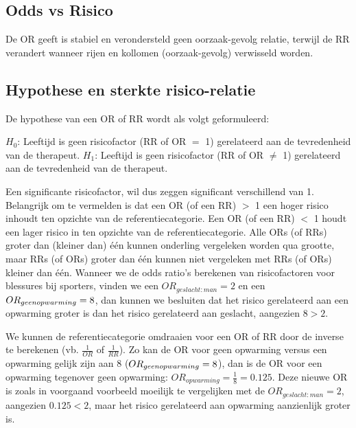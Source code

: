 \documentclass[
]{book}
\theoremstyle{definition}
\theoremstyle{definition}
\theoremstyle{definition}
\theoremstyle{definition}
\theoremstyle{remark}
\begin{document}
\hypertarget{odds-vs-risico}{%
\subsection*{Odds vs Risico}\label{odds-vs-risico}}


De OR geeft is stabiel en verondersteld geen oorzaak-gevolg relatie, terwijl de RR verandert wanneer rijen en kollomen (oorzaak-gevolg) verwisseld worden.

\hypertarget{hypothese-en-sterkte-risico-relatie}{%
\subsection*{Hypothese en sterkte risico-relatie}\label{hypothese-en-sterkte-risico-relatie}}


De hypothese van een OR of RR wordt als volgt geformuleerd:

\(H_0\): Leeftijd is geen risicofactor (RR of OR \(=\) 1) gerelateerd aan de tevredenheid van de therapeut. \(H_1\): Leeftijd is geen risicofactor (RR of OR \(\neq\) 1) gerelateerd aan de tevredenheid van de therapeut.

Een significante risicofactor, wil dus zeggen significant verschillend van 1. Belangrijk om te vermelden is dat een OR (of een RR) \(>\) 1 een hoger risico inhoudt ten opzichte van de referentiecategorie. Een OR (of een RR) \(<\) 1 houdt een lager risico in ten opzichte van de referentiecategorie. Alle ORs (of RRs) groter dan (kleiner dan) één kunnen onderling vergeleken worden qua grootte, maar RRs (of ORs) groter dan één kunnen niet vergeleken met RRs (of ORs) kleiner dan één. Wanneer we de odds ratio's berekenen van risicofactoren voor blessures bij sporters, vinden we een \(OR_{geslacht:man} = 2\) en een \(OR_{geen \space opwarming} = 8\), dan kunnen we besluiten dat het risico gerelateerd aan een opwarming groter is dan het risico gerelateerd aan geslacht, aangezien \(8 > 2\).

We kunnen de referentiecategorie omdraaien voor een OR of RR door de inverse te berekenen (vb. \(\frac{1}{OR}\) of \(\frac{1}{RR}\)). Zo kan de OR voor geen opwarming versus een opwarming gelijk zijn aan 8 (\(OR_{geen \space opwarming} = 8\)), dan is de OR voor een opwarming tegenover geen opwarming: \(OR_{opwarming} = \frac{1}{8} = 0.125\). Deze nieuwe OR is zoals in voorgaand voorbeeld moeilijk te vergelijken met de \(OR_{geslacht:man} = 2\), aangezien \(0.125 < 2\), maar het risico gerelateerd aan opwarming aanzienlijk groter is.
\end{document}
